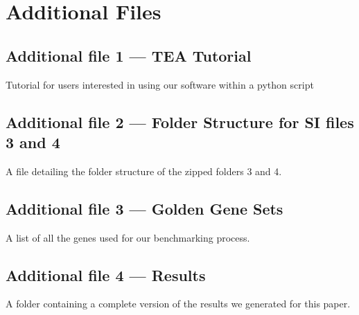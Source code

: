 %
%

\section*{Additional Files}
  \subsection*{Additional file 1 --- TEA Tutorial}
    Tutorial for users interested in using our software within a python script
  \subsection*{Additional file 2 --- Folder Structure for SI files 3 and 4}
    A file detailing the folder structure of the zipped folders 3 and 4.
  \subsection*{Additional file 3 --- Golden Gene Sets}
    A list of all the genes used for our benchmarking process.
  \subsection*{Additional file 4 --- Results}
    A folder containing a complete version of the results we generated for this
    paper.
